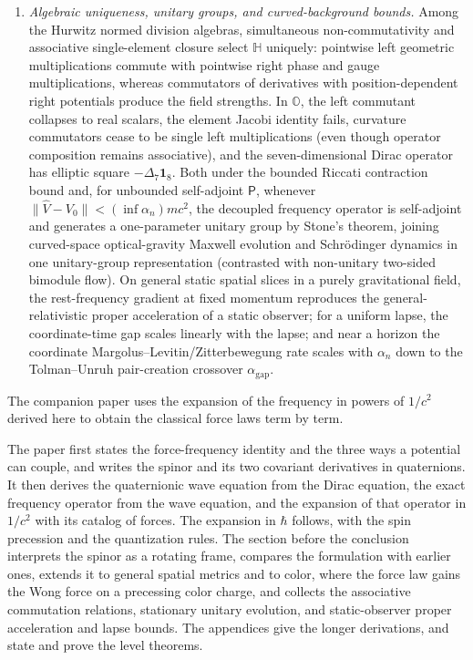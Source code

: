 \documentclass[aps,prd,onecolumn,tightenlines,nofootinbib,notitlepage,11pt,floatfix]{revtex4-2}
\theoremstyle{indentedtheorem}
\begin{document}
\begin{enumerate}[label=(\roman*)]
\item \emph{Algebraic uniqueness, unitary groups, and curved-background bounds.} Among the Hurwitz normed division algebras, simultaneous non-commutativity and associative single-element closure select $\mathbb{H}$ uniquely: pointwise left geometric multiplications commute with pointwise right phase and gauge multiplications, whereas commutators of derivatives with position-dependent right potentials produce the field strengths. In $\mathbb{O}$, the left commutant collapses to real scalars, the element Jacobi identity fails, curvature commutators cease to be single left multiplications (even though operator composition remains associative), and the seven-dimensional Dirac operator has elliptic square $-\Delta_7\mathbf{1}_8$. Both under the bounded Riccati contraction bound and, for unbounded self-adjoint $\mathsf{P}$, whenever $\|\hat{V}-V_0\|<(\inf\alpha_n)mc^2$, the decoupled frequency operator is self-adjoint and generates a one-parameter unitary group by Stone's theorem, joining curved-space optical-gravity Maxwell evolution and Schr\"odinger dynamics in one unitary-group representation (contrasted with non-unitary two-sided bimodule flow). On general static spatial slices in a purely gravitational field, the rest-frequency gradient at fixed momentum reproduces the general-relativistic proper acceleration of a static observer; for a uniform lapse, the coordinate-time gap scales linearly with the lapse; and near a horizon the coordinate Margolus--Levitin/Zitterbewegung rate scales with $\alpha_n$ down to the Tolman--Unruh pair-creation crossover $\alpha_\text{gap}$.
\end{enumerate}

The companion paper uses the expansion of the frequency in powers of $1/c^2$ derived here to obtain the classical force laws term by term.

The paper first states the force-frequency identity and the three ways a potential can couple, and writes the spinor and its two covariant derivatives in quaternions. It then derives the quaternionic wave equation from the Dirac equation, the exact frequency operator from the wave equation, and the expansion of that operator in $1/c^2$ with its catalog of forces. The expansion in $\hbar$ follows, with the spin precession and the quantization rules. The section before the conclusion interprets the spinor as a rotating frame, compares the formulation with earlier ones, extends it to general spatial metrics and to color, where the force law gains the Wong force on a precessing color charge, and collects the associative commutation relations, stationary unitary evolution, and static-observer proper acceleration and lapse bounds. The appendices give the longer derivations, and state and prove the level theorems.
\end{document}

